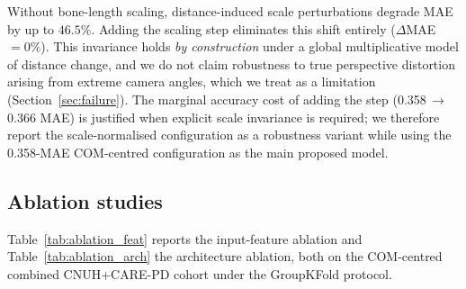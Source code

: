 \documentclass[preprint,12pt]{elsarticle}
\begin{document}
Without bone-length scaling, distance-induced scale perturbations degrade MAE by
up to $46.5\%$. Adding the scaling step eliminates this shift entirely
($\Delta$MAE $=0\%$). This invariance holds \emph{by construction} under a global
multiplicative model of distance change, and we do not claim robustness to true
perspective distortion arising from extreme camera angles, which we treat as a
limitation (Section~\ref{sec:failure}). The marginal accuracy cost of adding the
step (0.358\,$\to$\,0.366 MAE) is justified when explicit scale invariance is
required; we therefore report the scale-normalised configuration as a robustness
variant while using the 0.358-MAE COM-centred configuration as the main
proposed model.

\subsection{Ablation studies}
\label{sec:ablation}
Table~\ref{tab:ablation_feat} reports the input-feature ablation and
Table~\ref{tab:ablation_arch} the architecture ablation, both on the
COM-centred combined CNUH+CARE-PD cohort under the GroupKFold protocol.

\begin{table}[htpb]
\centering
\caption{Input-feature ablation on the combined CNUH+CARE-PD cohort
(GroupKFold 5-fold, $N=6{,}087$).
Lower MAE/RMSE and higher F1 are better.}
\label{tab:ablation_feat}
\end{table}

\begin{table}[htpb]
\centering
\caption{Architecture ablation on the combined CNUH+CARE-PD cohort
(Configuration~D features, GroupKFold 5-fold).}
\label{tab:ablation_arch}
\end{table}
\end{document}
